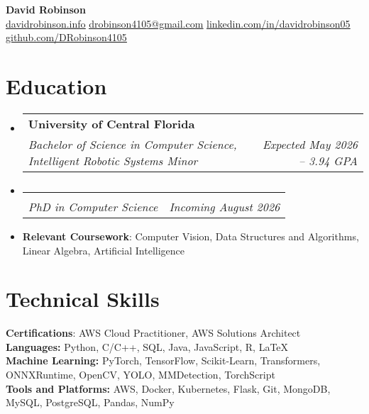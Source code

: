 \documentclass[letterpaper,11pt]{article}
\makeatletter
\newcommand{\educationItem}[1]{
  \item\small{
    {#1 \vspace{-5pt}}
  }
}
\newcommand{\resumeSubheading}[4]{
  \vspace{-2pt}\item
    \begin{tabular*}{0.97\textwidth}[t]{l@{\extracolsep{\fill}}r}
      \textbf{#1} & #2 \\
      \textit{\small#3} & \textit{\small #4} \\
    \end{tabular*}\vspace{-7pt}
}
\newcommand{\resumeSubHeadingListStart}{\begin{itemize}[leftmargin=0.15in, label={}]}
\newcommand{\resumeSubHeadingListEnd}{\end{itemize}}
\makeatother
\begin{document}
\begin{center}
  \textbf{\Huge David Robinson} \\ \vspace{2pt} \small
  \faCode\hspace{0.25pt} \href{https://www.davidrobinson.info/}{\uline{davidrobinson.info}}
  \faEnvelope\hspace{0.25pt} \href{mailto:drobinson4105@gmail.com}{\uline{drobinson4105@gmail.com}}
  \faLinkedin\hspace{0.25pt} \href{https://linkedin.com/in/davidrobinson05}{\uline{linkedin.com/in/davidrobinson05}}
  \faGithub\hspace{0.25pt} \href{https://github.com/DRobinson4105}{\uline{github.com/DRobinson4105}}
\end{center}

\section{Education}
  \resumeSubHeadingListStart
    \resumeSubheading
      {University of Central Florida}{}
      {Bachelor of Science in Computer Science, Intelligent Robotic Systems Minor}{Expected May 2026 -- 3.94 GPA}
      \resumeSubheading
        {\vspace{-1.5em}}{}
        {PhD in Computer Science}{Incoming August 2026}
    \educationItem{\textbf{Relevant Coursework}: Computer Vision, Data Structures and Algorithms, Linear Algebra, Artificial Intelligence}
  \resumeSubHeadingListEnd

\section{Technical Skills}
  \begin{itemize}[leftmargin=0.15in, label={}]
    \small{\item{
      \textbf{Certifications}: AWS Cloud Practitioner, AWS Solutions Architect \\
      \textbf{Languages:}{ Python, C/C++, SQL, Java, JavaScript, R, LaTeX} \\
      \textbf{Machine Learning:}{ PyTorch, TensorFlow, Scikit-Learn, Transformers, ONNXRuntime, OpenCV, YOLO, MMDetection, TorchScript} \\
      \textbf{Tools and Platforms:}{ AWS, Docker, Kubernetes, Flask, Git, MongoDB, MySQL, PostgreSQL, Pandas, NumPy}
    }}
  \end{itemize}
\end{document}
